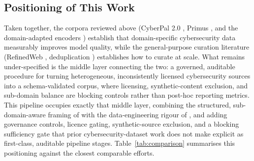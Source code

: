 \documentclass[conference]{IEEEtran}
\begin{document}
\subsection{Positioning of This Work}

Taken together, the corpora reviewed above (CyberPal 2.0 \cite{levi2025cyberpal}, Primus \cite{yu2025primus}, and the domain-adapted encoders \cite{aghaei2022securebert,bayer2024cysecbert}) establish that domain-specific cybersecurity data measurably improves model quality, while the general-purpose curation literature (RefinedWeb \cite{penedo2023refinedweb}, deduplication \cite{lee2022deduplication,abbas2023semdedup}) establishes how to curate at scale. What remains under-specified is the middle layer connecting the two: a governed, auditable procedure for turning heterogeneous, inconsistently licensed cybersecurity sources into a schema-validated corpus, where licensing, synthetic-content exclusion, and sub-domain balance are blocking controls rather than post-hoc reporting metrics. This pipeline occupies exactly that middle layer, combining the structured, sub-domain-aware framing of \cite{alsada2025attck,rani2024ttpxhunter,abdeen2023smet,park2023pretrained} with the data-engineering rigour of \cite{penedo2023refinedweb,leskovec2014mmd}, and adding governance controls, licence gating, synthetic-source exclusion, and a blocking sufficiency gate that prior cybersecurity-dataset work does not make explicit as first-class, auditable pipeline stages. Table~\ref{tab:comparison} summarises this positioning against the closest comparable efforts.
\end{document}

